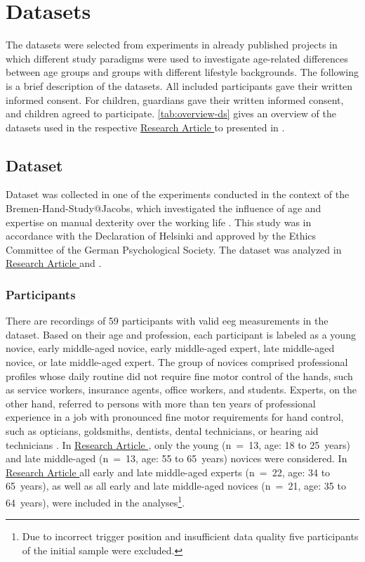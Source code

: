 \section{Datasets}
The datasets were selected from experiments in already published projects in which different study paradigms were used to investigate age-related differences between age groups and groups with different lifestyle backgrounds. The following is a brief description of the datasets. All included participants gave their written informed consent. For children, guardians gave their written informed consent, and children agreed to participate. \autoref{tab:overview-ds} gives an overview of the datasets used in the respective \hyperref[results:paperI]{Research Article } to \hyperref[results:paperIV]{} presented in .

\subsection{Dataset }
\label{methods:datasets:I}
Dataset  was collected in one of the experiments conducted in the context of the Bremen-Hand-Study@Jacobs, which investigated the influence of age and expertise on manual dexterity over the working life \cite{Voelcker-Rehage2013}. This study was in accordance with the Declaration of Helsinki and approved by the Ethics Committee of the German Psychological Society. The dataset was analyzed in \hyperref[results:paperI]{Research Article } and \hyperref[results:paperIV]{}. 

\subsubsection{Participants}
\label{methods:datasets:I:participants}
There are recordings of 59 participants with valid \gls{eeg} measurements in the dataset. Based on their age and profession, each participant is labeled as a young novice, early middle-aged novice, early middle-aged expert, late middle-aged novice, or late middle-aged expert. The group of novices comprised professional profiles whose daily routine did not require fine motor control of the hands, such as service workers, insurance agents, office workers, and students. Experts, on the other hand, referred to persons with more than ten years of professional experience in a job with pronounced fine motor requirements for hand control, such as opticians, goldsmiths, dentists, dental technicians, or hearing aid technicians \cite{Ericsson1991}. In \hyperref[results:paperI]{Research Article }, only the young (n~=~13, age: 18 to 25~years) and late middle-aged (n~=~13, age: 55 to 65~years) novices were considered. In \hyperref[results:paperIV]{Research Article } all early and late middle-aged experts (n~=~22, age: 34 to 65~years), as well as all early and late middle-aged novices (n~=~21, age: 35 to 64~years), were included in the analyses\footnote{Due to incorrect trigger position and insufficient data quality five participants of the initial sample were excluded.}.

